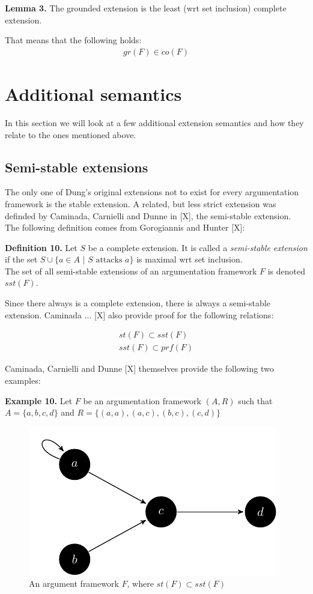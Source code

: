 \documentclass[draft,final]{vutinfth} %
\newcommand{\hl}{\par\vspace{6pt}} %
\newcommand{\cl}{\par\vspace{12pt}} %
\begin{document}
\textbf{Lemma 3.}
The grounded extension is the least (wrt set inclusion) complete extension.\hl
That means that the following holds:
\begin{align}
	gr(F)\in co(F)
\end{align}\cl

\section{Additional semantics}
In this section we will look at a few additional extension semantics and how they relate to the ones mentioned above.

\subsection{Semi-stable extensions}
The only one of Dung's original extensions not to exist for every argumentation framework is the stable extension. A related, but less strict extension was definded by Caminada, Carnielli and Dunne in [X], the semi-stable extension. The following definition comes from Gorogiannis and Hunter [X]:\hl

\textbf{Definition 10.} Let $S$ be a complete extension. It is called a \emph{semi-stable extension} if the set $S\cup\{a\in A\text{ | } S\text{ attacks }a\}$ is maximal wrt set inclusion.\\ %
The set of all semi-stable extensions of an argumentation framework $F$ is denoted $sst(F)$.\hl

Since there always is a complete extension, there is always a semi-stable extension. Caminada ... [X] also provide proof for the following relations: %


\begin{align}
	st(F)\subset sst(F)\\
	sst(F)\subset prf(F)
\end{align}\cl

Caminada, Carnielli and Dunne [X] themselves provide the following two examples:\hl

\textbf{Example 10.} Let $F$ be an argumentation framework $(A,R)$ such that $A=\{a,b,c,d\}$ and $R=\{(a,a),(a,c),(b,c),(c,d)\}$\hl

\FloatBarrier
	\begin{figure}[!h]
		\centering
		\includegraphics[scale=1.5]{graphs/ex4.pdf}
		\caption{An argument framework $F$, where $st(F)\subset sst(F)$}
	\end{figure}
\FloatBarrier
\end{document}
